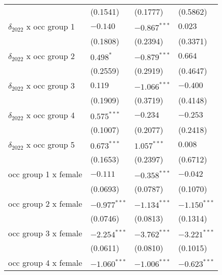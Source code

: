 \begin{tabular}{llll}
                                       &           (0.1541) &           (0.1777) &           (0.5862) \\
$\delta_{2022}$ x occ group 1          &           $-0.140$ &     $-0.867^{***}$ &            $0.023$ \\
                                       &           (0.1808) &           (0.2394) &           (0.3371) \\
$\delta_{2022}$ x occ group 2          &          $0.498^*$ &     $-0.879^{***}$ &            $0.664$ \\
                                       &           (0.2559) &           (0.2919) &           (0.4647) \\
$\delta_{2022}$ x occ group 3          &            $0.119$ &     $-1.066^{***}$ &           $-0.400$ \\
                                       &           (0.1909) &           (0.3719) &           (0.4148) \\
$\delta_{2022}$ x occ group 4          &      $0.575^{***}$ &           $-0.234$ &           $-0.253$ \\
                                       &           (0.1007) &           (0.2077) &           (0.2418) \\
$\delta_{2022}$ x occ group 5          &      $0.673^{***}$ &      $1.057^{***}$ &            $0.008$ \\
                                       &           (0.1653) &           (0.2397) &           (0.6712) \\
occ group 1 x female                   &           $-0.111$ &     $-0.358^{***}$ &           $-0.042$ \\
                                       &           (0.0693) &           (0.0787) &           (0.1070) \\
occ group 2 x female                   &     $-0.977^{***}$ &     $-1.134^{***}$ &     $-1.150^{***}$ \\
                                       &           (0.0746) &           (0.0813) &           (0.1314) \\
occ group 3 x female                   &     $-2.254^{***}$ &     $-3.762^{***}$ &     $-3.221^{***}$ \\
                                       &           (0.0611) &           (0.0810) &           (0.1015) \\
occ group 4 x female                   &     $-1.060^{***}$ &     $-1.006^{***}$ &     $-0.623^{***}$ \\

\end{tabular}
